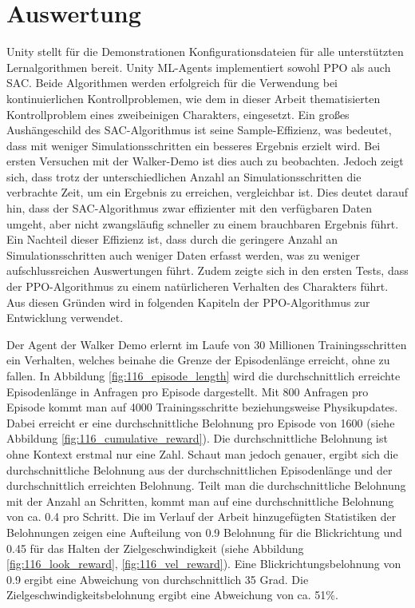 \section{Auswertung}
Unity stellt für die Demonstrationen Konfigurationsdateien für alle unterstützten Lernalgorithmen bereit. Unity ML-Agents implementiert sowohl PPO als auch SAC. Beide Algorithmen werden erfolgreich für die Verwendung bei kontinuierlichen Kontrollproblemen, wie dem in dieser Arbeit thematisierten Kontrollproblem eines zweibeinigen Charakters, eingesetzt. Ein großes Aushängeschild des SAC-Algorithmus ist seine Sample-Effizienz, was bedeutet, dass mit weniger Simulationsschritten ein besseres Ergebnis erzielt wird. Bei ersten Versuchen mit der Walker-Demo ist dies auch zu beobachten. Jedoch zeigt sich, dass trotz der unterschiedlichen Anzahl an Simulationsschritten die verbrachte Zeit, um ein Ergebnis zu erreichen, vergleichbar ist. Dies deutet darauf hin, dass der SAC-Algorithmus zwar effizienter mit den verfügbaren Daten umgeht, aber nicht zwangsläufig schneller zu einem brauchbaren Ergebnis führt. Ein Nachteil dieser Effizienz ist, dass durch die geringere Anzahl an Simulationsschritten auch weniger Daten erfasst werden, was zu weniger aufschlussreichen Auswertungen führt. Zudem zeigte sich in den ersten Tests, dass der PPO-Algorithmus zu einem natürlicheren Verhalten des Charakters führt. Aus diesen Gründen wird in folgenden Kapiteln der PPO-Algorithmus zur Entwicklung verwendet.

Der Agent der Walker Demo erlernt im Laufe von 30 Millionen Trainingsschritten ein Verhalten, welches beinahe die Grenze der Episodenlänge erreicht, ohne zu fallen. In Abbildung \ref{fig:116_episode_length} wird die durchschnittlich erreichte Episodenlänge in Anfragen pro Episode dargestellt. Mit 800 Anfragen pro Episode kommt man auf 4000 Trainingsschritte beziehungsweise Physikupdates. Dabei erreicht er eine durchschnittliche Belohnung pro Episode von 1600 (siehe Abbildung \ref{fig:116_cumulative_reward}). Die durchschnittliche Belohnung ist ohne Kontext erstmal nur eine Zahl. Schaut man jedoch genauer, ergibt sich die durchschnittliche Belohnung aus der durchschnittlichen Episodenlänge und der durchschnittlich erreichten Belohnung. Teilt man die durchschnittliche Belohnung mit der Anzahl an Schritten, kommt man auf eine durchschnittliche Belohnung von ca. 0.4 pro Schritt. Die im Verlauf der Arbeit hinzugefügten Statistiken der Belohnungen zeigen eine Aufteilung von 0.9 Belohnung für die Blickrichtung und 0.45 für das Halten der Zielgeschwindigkeit (siehe Abbildung \ref{fig:116_look_reward}, \ref{fig:116_vel_reward}). Eine Blickrichtungsbelohnung von 0.9 ergibt eine Abweichung von durchschnittlich 35 Grad. Die Zielgeschwindigkeitsbelohnung ergibt eine Abweichung von ca. 51\%.

